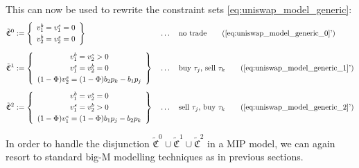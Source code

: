 \documentclass[11pt,parskip=full]{scrartcl}%
\newcommand*{\token}{\tau}                  %
\begin{document}
This can now be used to rewrite the constraint sets \eqref{eq:uniswap_model_generic}:
\begin{subequations}
  \begin{align}
    \mathfrak{\tilde{C}}^0 &:= \left\{
    \begin{array}{c}
      v_1^b = v_1^s = 0 \\[1mm]
      v_2^b = v_2^s = 0
    \end{array}
    \right\}
    && \ldots \quad \text{no trade}
    \tag{\ref{eq:uniswap_model_generic_0}'}
    \\[2mm]
    \mathfrak{\tilde{C}}^1 &:= \left\{
    \begin{array}{c}
      v_1^b = v_2^s > 0 \\[1mm]
      v_1^s = v_2^b = 0 \\[1mm]
      (1-\Phi) v_2^s = (1-\Phi) b_2 p_k - b_1 p_j
    \end{array}
    \right\}
    && \ldots \quad \text{buy $\token_j$, sell $\token_k$}
    \tag{\ref{eq:uniswap_model_generic_1}'}
    \\[2mm]
    \mathfrak{\tilde{C}}^2 &:= \left\{
    \begin{array}{c}
      v_1^b = v_2^s = 0 \\[1mm]
      v_1^s = v_2^b > 0 \\[1mm]
      (1-\Phi) v_1^s = (1-\Phi) b_1 p_j - b_2 p_k
    \end{array}
    \right\}
    && \ldots \quad \text{sell $\token_j$, buy $\token_k$}
    \tag{\ref{eq:uniswap_model_generic_2}'}
  \end{align}
  \label{eq:uniswap_model_linear}
\end{subequations}

In order to handle the disjunction $\mathfrak{\tilde{C}}^0 \cup \mathfrak{\tilde{C}}^1 \cup \mathfrak{\tilde{C}}^2$ in a MIP model, we can again resort to standard big-M modelling techniques as in previous sections.
\end{document}
